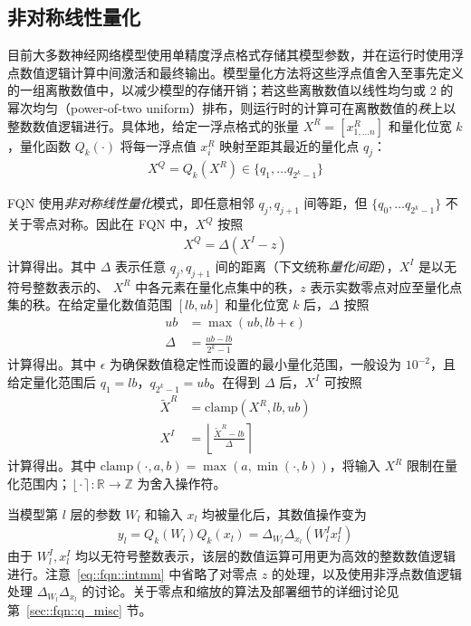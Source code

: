 \documentclass[
  fontset = mac,
]{shtthesis}
\providecommand{\Round}[1]{\left\lfloor #1 \right\rceil}
\providecommand{\Clamp}[1]{\mathrm{clamp}\left( #1 \right)}
\begin{document}
\subsection{非对称线性量化} \label{sec::fqn::quant_scheme}
目前大多数神经网络模型使用单精度浮点格式存储其模型参数，并在运行时使用浮点数值逻辑计算中间激活和最终输出。模型量化方法将这些浮点值舍入至事先定义的一组离散数值中，以减少模型的存储开销；若这些离散数值以线性均匀或 2 的幂次均匀（power-of-two uniform）排布，则运行时的计算可在离散数值的\emph{秩}上以整数数值逻辑进行。具体地，给定一浮点格式的张量 $X^R = [x^R_{1, \ldots n}]$ 和量化位宽 $k$，量化函数 $Q_k(\cdot)$ 将每一浮点值 $x^R_i$ 映射至距其最近的量化点 $q_j$：
\begin{align}
  X^Q = Q_k(X^R) \in \{q_1, \ldots q_{2^k-1}\} 
\end{align}

FQN 使用\emph{非对称线性量化}模式，即任意相邻 $q_j, q_{j+1}$ 间等距，但 $\{q_0, \ldots q_{2^k-1}\}$ 不关于零点对称。因此在 FQN 中，$X^Q$ 按照
\begin{align}
  X^Q = \Delta (X^I - z) \label{eq::fqn::asymm_linear_q}
\end{align}
计算得出。其中 $\Delta$ 表示任意 $q_j, q_{j+1}$ 间的距离（下文统称\emph{量化间距}），$X^I$ 是以无符号整数表示的、 $X^R$ 中各元素在量化点集中的秩，$z$ 表示实数零点对应至量化点集的秩。在给定量化数值范围 $[lb, ub]$ 和量化位宽 $k$ 后，$\Delta$ 按照
\begin{align}
  ub &= \max(ub, lb + \epsilon) \\
  \Delta &= \frac{ub - lb}{2^k - 1}
\end{align}
计算得出。其中 $\epsilon$ 为确保数值稳定性而设置的最小量化范围，一般设为 $10^{-2}$，且给定量化范围后 $q_1 = lb$，$q_{2^k-1} = ub$。在得到 $\Delta$ 后，$X^I$ 可按照
\begin{align}
  \tilde{X}^R &= \Clamp{X^R, lb, ub} \\
  X^I &= \Round{\frac{\tilde{X}^R - lb}{\Delta}}
\end{align}
计算得出。其中 $\Clamp{\cdot, a, b} = \max(a, \min(\cdot, b))$，将输入 $X^R$ 限制在量化范围内；$\Round{\cdot}: \mathbb{R}\to\mathbb{Z}$ 为舍入操作符。

当模型第 $l$ 层的参数 $W_l$ 和输入 $x_l$ 均被量化后，其数值操作变为
\begin{align}
  y_l = Q_k(W_l) Q_k(x_l) = \Delta_{W_l}\Delta_{x_l} (W^I_l x^I_l) \label{eq::fqn::intmm}
\end{align}
由于 $W^I_l, x^I_l$ 均以无符号整数表示，该层的数值运算可用更为高效的整数数值逻辑进行。注意~\eqref{eq::fqn::intmm} 中省略了对零点 $z$ 的处理，以及使用非浮点数值逻辑处理 $\Delta_{W_l}\Delta_{x_l}$ 的讨论。关于零点和缩放的算法及部署细节的详细讨论见第~\ref{sec::fqn::q_misc} 节。%
\end{document}
